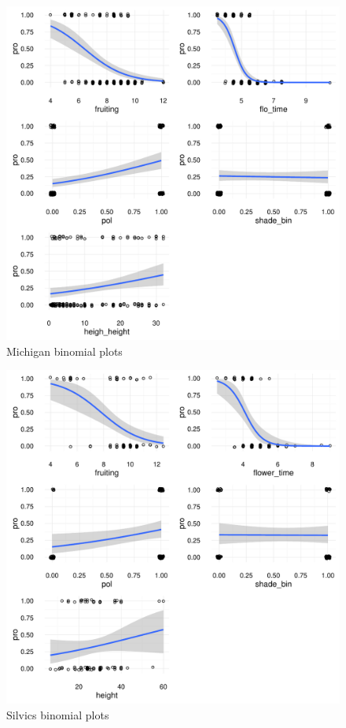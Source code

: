 \documentclass{article}\usepackage[]{graphicx}\usepackage[]{color}
\makeatletter
\def\maxwidth{ %
  \ifdim\Gin@nat@width>\linewidth
    \linewidth
  \else
    \Gin@nat@width
  \fi
}
\newenvironment{knitrout}{}{} %
\makeatother
\begin{document}
\begin{figure}[h!]
\begin{knitrout}
\color{fgcolor}
\includegraphics[width=\maxwidth]{figure/unnamed-chunk-8-1} 

\end{knitrout}
\caption{Michigan binomial plots}
\end{figure}

\begin{figure}[h!]
\begin{knitrout}
\color{fgcolor}
\includegraphics[width=\maxwidth]{figure/unnamed-chunk-9-1} 

\end{knitrout}
\caption{Silvics binomial plots}
\end{figure}
\end{document}
